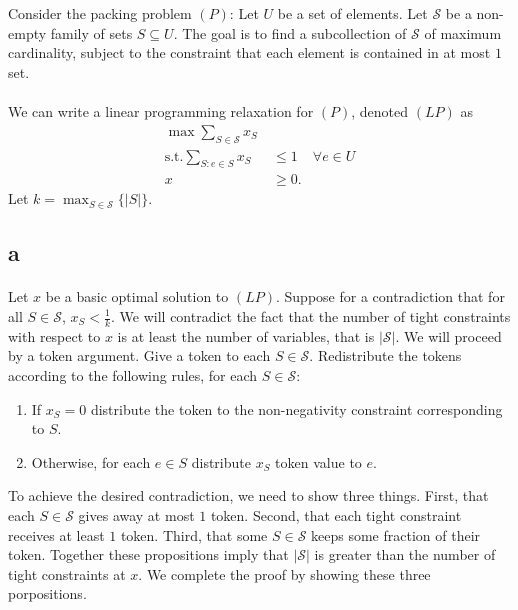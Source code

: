 \documentclass[letterpaper,12pt,oneside,onecolumn]{article}
\newcommand{\cS}{\mathcal{S}} \newcommand{\cT}{\mathcal{T}}
\begin{document}
\section{}
\paragraph{}
Consider the packing problem $(P)$: Let $U$ be a set of elements. Let $\cS$ be a non-empty family of sets $S\subseteq U$. The goal is to find a subcollection of $\cS$ of maximum cardinality, subject to the constraint that each element is contained in at most $1$ set.
\paragraph{}
We can write a linear programming relaxation for $(P)$, denoted $(LP)$ as
\begin{align*}
\max \sum_{S\in\cS} x_S\ & \\
\text{s.t.} \sum_{S:e\in S} x_S &\leq 1 &\forall e\in U \\
x&\geq 0.
\end{align*}
Let $k = \max_{S\in \cS} \{ |S|\}$.
\subsection*{a}
\paragraph{}
Let $x$ be a basic optimal solution to $(LP)$. Suppose for a contradiction that for all $S \in \cS$, $x_S < \frac{1}{k}$. We will contradict the fact that the number of tight constraints with respect to $x$ is at least the number of variables, that is $|\cS|$. We will proceed by a token argument. Give a token to each $S \in \cS$. Redistribute the tokens according to the following rules, for each $S \in \cS$:
\begin{enumerate}
\item If $x_S = 0$ distribute the token to the non-negativity constraint corresponding to $S$.
\item Otherwise, for each $e \in S$ distribute $x_S$ token value to $e$.
\end{enumerate}
To achieve the desired contradiction, we need to show three things. First, that each $S \in \cS$ gives away at most $1$ token. Second, that each tight constraint receives at least $1$ token. Third, that some $S \in \cS$ keeps some fraction of their token. Together these propositions imply that $|\cS|$ is greater than the number of tight constraints at $x$. We complete the proof by showing these three porpositions.
\end{document}
